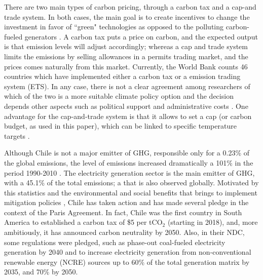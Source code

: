 \documentclass[11pt, letterpaper]{article}
\begin{document}
\smallskip
There are two main types of carbon pricing, through a carbon tax and a cap-and trade system. In both cases, the main goal is to create incentives to change the investment in favor of ``green" technologies as opposed to the polluting carbon-fueled generators \cite{Chen2011}. A carbon tax puts a price on carbon, and the expected output is that emission levels will adjust accordingly; whereas a cap and trade system limits the emissions by selling allowances in a permits trading market, and the prices comes naturally from this market. Currently, the World Bank counts 46 countries which have implemented either a carbon tax or a emission trading system (ETS). In any case, there is not a clear agreement among researchers of which of the two is a more suitable climate policy option and the decision depends other aspects such as political support and administrative costs \cite{goulder2013carbon}.  One advantage for the cap-and-trade system is that it allows to set a cap (or carbon budget, as used in this paper), which can be linked to specific temperature targets \cite{feijoo2019climate,Binsted2019}. 


\smallskip
Although Chile is not a major emitter of GHG, responsible only for a 0.23\% of the global emissions, the level of emissions increased dramatically a 101\% in the period 1990-2010 \cite{ChileInformeBienal2016}. The electricity generation sector is the main emitter of GHG, with a 45.1\% of the total emissions; a that is also observed globally. Motivated by this statistics and the environmental and social benefits that brings to implement mitigation policies \cite{benavides2015impact}, Chile has taken action and has made several pledge in the context of the Paris Agreement. In fact, Chile was the first country in South America to established a carbon tax of \$5 per tCO$_2$ (starting  in 2018), and, more ambitiously, it has announced carbon neutrality by 2050. Also, in their NDC, some regulations were pledged, such as phase-out coal-fueled electricity generation by 2040 and to increase electricity generation from non-conventional renewable energy (NCRE) sources up to 60\% of the total generation matrix by 2035, and 70\% by 2050. 
\end{document}

